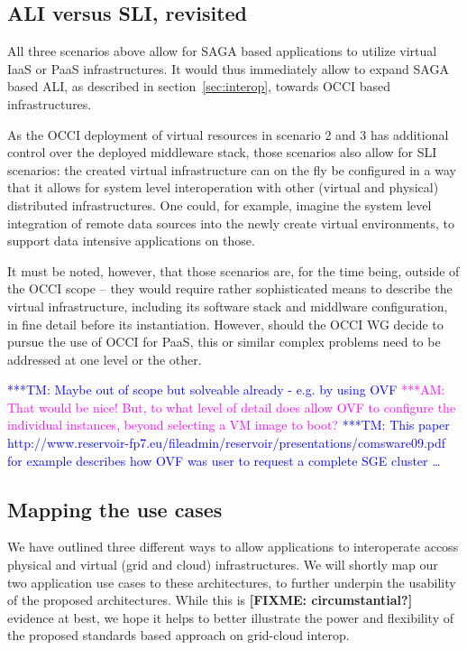 \documentclass[10pt,conference,final,letterpaper,twoside,twocolumn,]{IEEEtran}
\newcommand{\amnote}[1]{  {\textcolor{magenta} {***AM: #1}}}
\newcommand{\tmnote}[1]{  {\textcolor{blue}    {***TM: #1}}}
\newcommand{\amnote}[1]{}
\newcommand{\tmnote}[1]{}
\newcommand{\B}[1]{\textbf{#1}}
\newcommand{\F}[1]{\B{[FIXME: #1]}}
\begin{document}
 \subsection{ALI versus SLI, revisited}

 All three scenarios above allow for SAGA based applications to
 utilize virtual IaaS or PaaS infrastructures.  It would thus
 immediately allow to expand SAGA based ALI, as described in
 section~\ref{sec:interop}, towards OCCI based infrastructures.

 As the OCCI deployment of virtual resources in scenario 2 and 3 has
 additional control over the deployed middleware stack, those
 scenarios also allow for SLI scenarios: the created virtual
 infrastructure can on the fly be configured in a way that it allows
 for system level interoperation with other (virtual and physical)
 distributed infrastructures.  One could, for example, imagine the
 system level integration of remote data sources into the newly create
 virtual environments, to support data intensive applications on
 those.

 It must be noted, however, that those scenarios are, for the time
 being, outside of the OCCI scope -- they would require rather
 sophisticated means to describe the virtual infrastructure, including
 its software stack and middlware configuration, in fine detail before
 its instantiation.  However, should the OCCI WG decide to pursue the
 use of OCCI for PaaS, this or similar complex problems need to be
 addressed at one level or the other.

 \tmnote{Maybe out of scope but solveable already - e.g. by using OVF}
 \amnote{That would be nice!  But, to what level of detail does allow
 OVF to configure the individual instances, beyond selecting a VM
 image to boot?}
\tmnote{This paper http://www.reservoir-fp7.eu/fileadmin/reservoir/presentations/comsware09.pdf for example describes how OVF was user to request a complete SGE cluster \ldots}

 \subsection{Mapping the use cases}

 We have outlined three different ways to allow applications to
 interoperate accoss physical and virtual (grid and cloud)
 infrastructures.  We will shortly map our two application use cases
 to these architectures, to further underpin the usability of the
 proposed architectures.  While this is \F{circumstantial?} evidence
 at best, we hope it helps to better illustrate the power and
 flexibility of the proposed standards based approach on grid-cloud
 interop.
\end{document}
